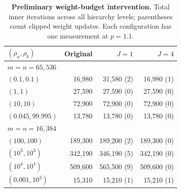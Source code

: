 \begin{table}[t]
\centering
\caption{\textbf{Preliminary weight-budget intervention.}
Total inner iterations across all hierarchy levels; parentheses count clipped weight updates.
Each configuration has one measurement at $p=1.1$.}
\label{tab:pduot-weight-budget}
\footnotesize
\setlength{\tabcolsep}{3pt}
\begin{tabular}{@{}lrrr@{}}
\toprule
$(\rho_a,\rho_b)$ & Original & $J=1$ & $J=4$ \\
\midrule
\multicolumn{4}{l}{$m=n=65{,}536$} \\
$(0.1,0.1)$ & 16,980 & 31,580 (2) & 16,980 (1) \\
$(1,1)$ & 27,590 & 27,590 (0) & 27,590 (0) \\
$(10,10)$ & 72,900 & 72,900 (0) & 72,900 (0) \\
$(0.045,99.995)$ & 13,780 & 13,780 (0) & 13,780 (0) \\
\midrule
\multicolumn{4}{l}{$m=n=16{,}384$} \\
$(100,100)$ & 189,300 & 189,200 (2) & 189,300 (0) \\
$(10^3,10^3)$ & 342,190 & 346,190 (5) & 342,190 (0) \\
$(10^4,10^4)$ & 509,600 & 565,500 (9) & 509,600 (0) \\
$(0.001,10^3)$ & 15,310 & 15,210 (1) & 15,210 (1) \\
\bottomrule
\end{tabular}
\end{table}
